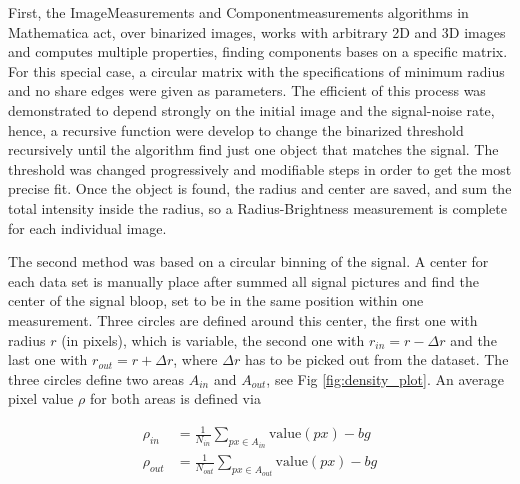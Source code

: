 First, the ImageMeasurements and Componentmeasurements algorithms in Mathematica act, over binarized images, works with arbitrary 2D and 3D images and computes multiple properties, finding components bases on a specific matrix. For this special case, a circular matrix with the specifications of minimum radius and no share edges were given as parameters. The efficient of this process was demonstrated to depend strongly on the initial image and the signal-noise rate, hence, a recursive function were develop to change the binarized threshold recursively until the algorithm find just one object that matches the signal. The threshold was changed progressively and modifiable steps in order to get the most precise fit. Once the object is found, the radius and center are saved, and sum the total intensity inside the radius, so a Radius-Brightness measurement is complete for each individual image.

The second method was based on a circular binning of the signal. A center for each data set is manually place after summed all signal pictures and find the center of the signal bloop, set to be in the same position within one measurement. Three circles are defined around this center, the first one with radius $r$ (in pixels), which is variable, the second one with $r_{in} = r-\Delta r$ and the last one with $r_{out} = r + \Delta r$, where $\Delta r$ has to be picked out from the dataset. The three circles define two areas $A_{in}$ and $A_{out}$, see Fig  \ref{fig:density_plot}. An average pixel value $\rho$ for both areas is defined via

\begin{align}
\rho_{in} & = \frac{1}{N_{in}} \sum_{px \in A_{in}} \text{value}(px) - bg \\
\rho_{out} & = \frac{1}{N_{out}} \sum_{px \in A_{out}} \text{value} (px) -bg \\
\end{align}

